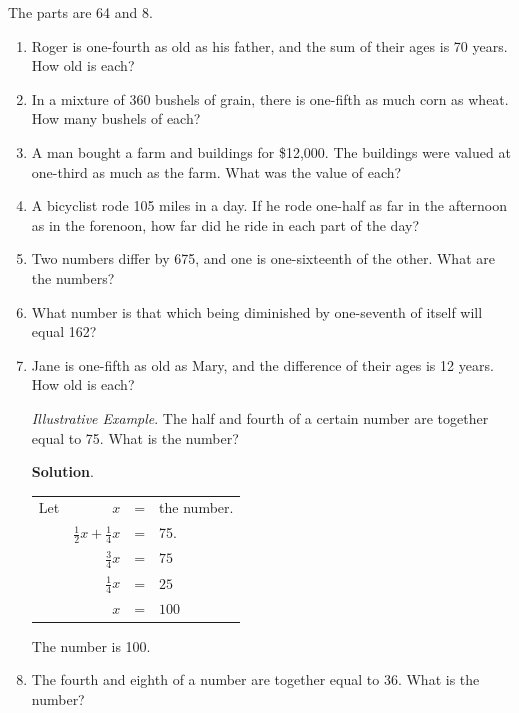 \documentclass{book}
\begin{document}
The parts are 64 and 8.

\begin{enumerate}
\item Roger is one-fourth as old as his father, and the sum of
their ages is 70 years. How old is each?

\item In a mixture of 360 bushels of grain, there is one-fifth as
much corn as wheat. How many bushels of each?

\item A man bought a farm and buildings for \$12,000. The
buildings were valued at one-third as much as the farm. What was
the value of each?

\item A bicyclist rode 105 miles in a day. If he rode one-half as
far in the afternoon as in the forenoon, how far did he ride in
each part of the day?

\item Two numbers differ by 675, and one is one-sixteenth of the
other. What are the numbers?

\item What number is that which being diminished by one-seventh of
itself will equal 162?

\item Jane is one-fifth as old as Mary, and the difference of
their ages is 12 years. How old is each?

\textit{ Illustrative Example}. The half and fourth of a certain
number are together equal to 75. What is the number?

\begin{center}
\textbf{ Solution}.
\end{center}
\begin{center}
\begin{tabular}{l r c l}
Let & $x$ &=& the number.\\
& $\frac{1}{2}x + \frac{1}{4}x $ &=& 75.\\
& $\frac{3}{4}x$ &=& $75$\\
& $\frac{1}{4}x $&=& $25$\\
& $x$&=& $100$\\
\end{tabular}
\end{center}

The number is 100.

\item The fourth and eighth of a number are together equal to 36.
What is the number?


\end{enumerate}
\end{document}
